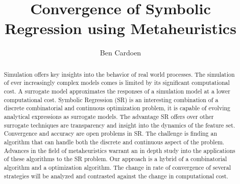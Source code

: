 \documentclass[]{article}
\title{Convergence of Symbolic Regression using Metaheuristics}
\author{Ben Cardoen}
\begin{document}
\maketitle

\begin{abstract}
Simulation offers key insights into the behavior of real world processes. The simulation of ever increasingly complex models comes is limited by its significant computational cost.
A surrogate model approximates the responses of a simulation model at a lower computational cost. 
Symbolic Regression (SR) is an interesting combination of a discrete combinatorial and continuous optimization problem, it is capable of evolving analytical expressions as surrogate models. 
The advantage SR offers over other surrogate techniques are transparency and insight into the dynamics of the feature set. %
Convergence and accuracy are open problems in SR. The challenge is finding an algorithm that can handle both the discrete and continuous aspect of the problem.
Advances in the field of metaheuristics warrant an in depth study into the applications of these algorithms to the SR problem. 
Our approach is a hybrid of a combinatorial algorithm and a optimization algorithm.
The change in rate of convergence of several strategies will be analyzed and contrasted against the change in computational cost.
\end{abstract}
\end{document}
